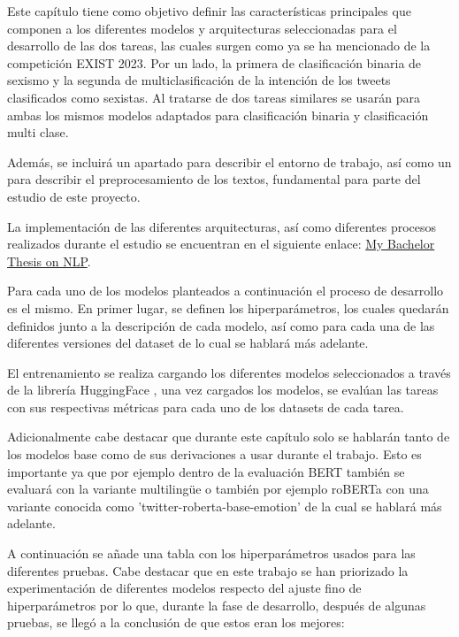 Este capítulo tiene como objetivo definir las características principales que componen a los diferentes modelos y arquitecturas seleccionadas para el desarrollo de las dos tareas, las cuales surgen como ya se ha mencionado de la competición EXIST 2023. Por un lado, la primera de clasificación binaria de sexismo y la segunda de multiclasificación de la intención de los tweets clasificados como sexistas. Al tratarse de dos tareas similares se usarán para ambas los mismos modelos adaptados para clasificación binaria y clasificación multi clase.

Además, se incluirá un apartado para describir el entorno de trabajo, así como un para describir el preprocesamiento de los textos, fundamental para parte del estudio de este proyecto.

La implementación de las diferentes arquitecturas, así como diferentes procesos realizados durante el estudio se encuentran en el siguiente enlace: \href{https://github.com/ValenUC3M/-NLP-BachelorThesis-GonzaloValenti}{My Bachelor Thesis on NLP}.

Para cada uno de los modelos planteados a continuación el proceso de desarrollo es el mismo. En primer lugar, se definen los hiperparámetros, los cuales quedarán definidos junto a la descripción de cada modelo, así como para cada una de las diferentes versiones del dataset de lo cual se hablará más adelante. 

El entrenamiento se realiza cargando los diferentes modelos seleccionados a través de la librería HuggingFace \cite{HuggingFace}, una vez cargados los modelos, se evalúan las tareas con sus respectivas métricas para cada uno de los datasets de cada tarea.

Adicionalmente cabe destacar que durante este capítulo solo se hablarán tanto de los modelos base como de sus derivaciones a usar durante el trabajo. Esto es importante ya que por ejemplo dentro de la evaluación BERT también se evaluará con la variante multilingüe \cite{bert-base-multilingual-cased} o también por ejemplo roBERTa con una variante conocida como 'twitter-roberta-base-emotion'\cite{twitter-roberta-base-emotion,} de la cual se hablará más adelante.

A continuación se añade una tabla con los hiperparámetros usados para las diferentes pruebas. Cabe destacar que en este trabajo se han priorizado la experimentación de diferentes modelos respecto del ajuste fino de hiperparámetros por lo que, durante la fase de desarrollo, después de algunas pruebas, se llegó a la conclusión de que estos eran los mejores:

